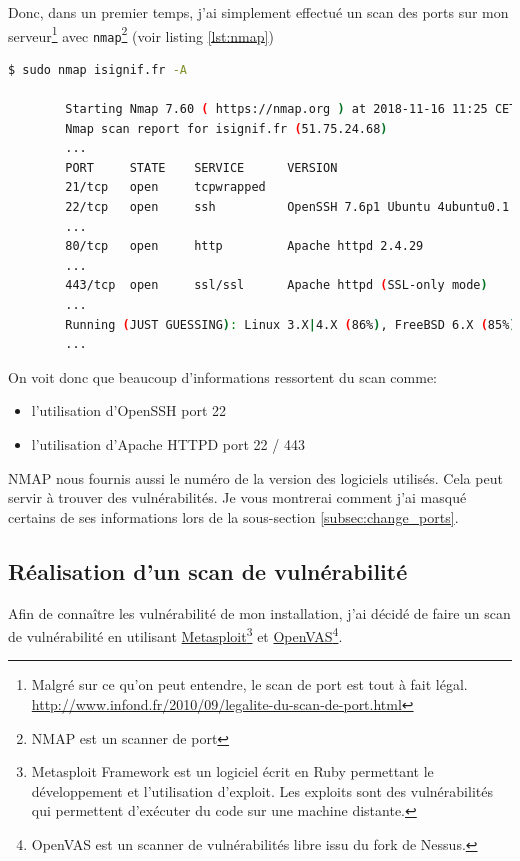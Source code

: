 \documentclass[]{report}
\begin{document}
      Donc, dans un premier temps, j'ai simplement effectué un scan des ports sur mon serveur\footnote{Malgré sur ce qu'on peut entendre, le scan de port est tout à fait légal. \url{http://www.infond.fr/2010/09/legalite-du-scan-de-port.html}} avec \verb|nmap|\footnote{NMAP est un scanner de port} (voir listing \ref{lst:nmap})

      \begin{scriptsize}
        \begin{lstlisting}[language=bash, caption={Un san des port sur le serveur d'iSignif en novembre 2018}, label={lst:nmap}]
        $ sudo nmap isignif.fr -A

        Starting Nmap 7.60 ( https://nmap.org ) at 2018-11-16 11:25 CET
        Nmap scan report for isignif.fr (51.75.24.68)
        ...
        PORT     STATE    SERVICE      VERSION
        21/tcp   open     tcpwrapped
        22/tcp   open     ssh          OpenSSH 7.6p1 Ubuntu 4ubuntu0.1 (Ubuntu Linux; protocol 2.0)
        ...
        80/tcp   open     http         Apache httpd 2.4.29
        ...
        443/tcp  open     ssl/ssl      Apache httpd (SSL-only mode)
        ...
        Running (JUST GUESSING): Linux 3.X|4.X (86%), FreeBSD 6.X (85%)
        ...
        \end{lstlisting}
      \end{scriptsize}

      On voit donc que beaucoup d'informations ressortent du scan comme:

      \begin{itemize}
        \item l'utilisation d'OpenSSH port 22
        \item l'utilisation d'Apache HTTPD port 22 / 443
      \end{itemize}

      NMAP nous fournis aussi le numéro de la version des logiciels utilisés. Cela peut servir à trouver des vulnérabilités. Je vous montrerai comment j'ai masqué certains de ses informations lors de la sous-section \ref{subsec:change_ports}.

    \subsection{Réalisation d'un scan de vulnérabilité}

      Afin de connaître les vulnérabilité de mon installation, j'ai décidé de faire un scan de vulnérabilité en utilisant \href{https://www.metasploit.com/}{Metasploit}\footnote{Metasploit Framework est un logiciel écrit en Ruby permettant le développement et l’utilisation d'exploit. Les exploits sont des vulnérabilités qui permettent d’exécuter du code sur une machine distante.} et \href{http://www.openvas.org/}{OpenVAS}\footnote{OpenVAS est un scanner de vulnérabilités libre issu du fork de Nessus.}.
\end{document}
